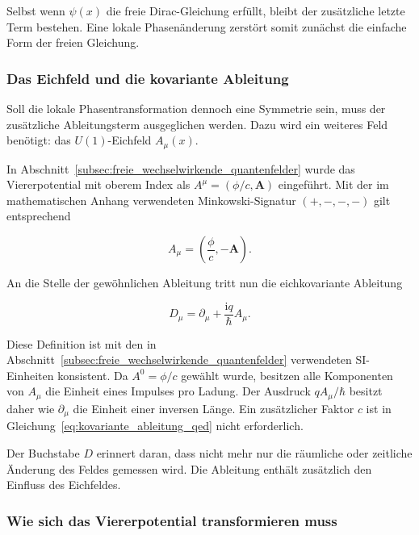 Selbst wenn \(\psi(x)\) die freie Dirac-Gleichung erfüllt, bleibt der
zusätzliche letzte Term bestehen. Eine lokale Phasenänderung zerstört
somit zunächst die einfache Form der freien Gleichung.

\subsubsection*{Das Eichfeld und die kovariante Ableitung}

Soll die lokale Phasentransformation dennoch eine Symmetrie sein, muss
der zusätzliche Ableitungsterm ausgeglichen werden. Dazu wird ein
weiteres Feld benötigt: das \(U(1)\)-Eichfeld
\(A_\mu(x)\).

In Abschnitt~\ref{subsec:freie_wechselwirkende_quantenfelder} wurde das
Viererpotential mit oberem Index als
\(A^\mu=(\phi/c,\mathbf A)\) eingeführt. Mit der im mathematischen
Anhang verwendeten Minkowski-Signatur \((+,-,-,-)\) gilt entsprechend

\begin{equation}
	A_\mu
	=
	\left(
	\frac{\phi}{c},
	-\mathbf A
	\right).
	\label{eq:viererpotential_unterer_index_qed}
\end{equation}

An die Stelle der gewöhnlichen Ableitung tritt nun die
eichkovariante Ableitung

\begin{equation}
	D_\mu
	=
	\partial_\mu
	+
	\frac{\mathrm{i}q}{\hbar}A_\mu.
	\label{eq:kovariante_ableitung_qed}
\end{equation}

Diese Definition ist mit den in
Abschnitt~\ref{subsec:freie_wechselwirkende_quantenfelder} verwendeten
SI-Einheiten konsistent. Da \(A^0=\phi/c\) gewählt wurde, besitzen alle
Komponenten von \(A_\mu\) die Einheit eines Impulses pro Ladung. Der Ausdruck
\(qA_\mu/\hbar\) besitzt daher wie \(\partial_\mu\) die Einheit einer
inversen Länge. Ein zusätzlicher Faktor \(c\) ist in
Gleichung~\eqref{eq:kovariante_ableitung_qed} nicht erforderlich.

Der Buchstabe \(D\) erinnert daran, dass nicht mehr nur die räumliche
oder zeitliche Änderung des Feldes gemessen wird. Die Ableitung enthält
zusätzlich den Einfluss des Eichfeldes.

\subsubsection*{Wie sich das Viererpotential transformieren muss}

